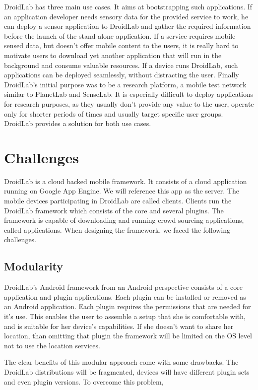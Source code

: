 \documentclass[conference,letterpaper]{IEEEtran}
\begin{document}
DroidLab has three main use cases. It aims at bootstrapping such applications. If an application developer needs sensory data for the provided service to work, he can deploy a sensor application to DroidLab and gather the required information before the launch of the stand alone application. If a service requires mobile sensed data, but doesn't offer mobile content to the users, it is really hard to motivate users to download yet another application that will run in the background and consume valuable resources. If a device runs DroidLab, such applications can be deployed seamlessly, without distracting the user. Finally DroidLab's initial purpose was to be a research platform, a mobile test network similar to PlanetLab and SenseLab. It is especially difficult to deploy applications for research purposes, as they usually don't provide any value to the user, operate only for shorter periods of times and usually target specific user groups. DroidLab provides a solution for both use cases.

\section{Challenges}
DroidLab is a cloud backed mobile framework. It consists of a cloud application running on Google App Engine. We will reference this app as the server. The mobile devices participating in DroidLab are called clients. Clients run the DroidLab framework which consists of the core and several plugins. The framework is capable of downloading and running crowd sourcing applications, called applications. When designing the framework, we faced the following challenges.

\subsection{Modularity}
DroidLab's Android framework from an Android perspective consists of a core application and plugin applications. Each plugin can be installed or removed as an Android application. Each plugin requires the permissions that are needed for it's use. This enables the user to assemble a setup that she is comfortable with, and is suitable for her device's capabilities. If she doesn't want to share her location, than omitting that plugin the framework will be limited on the OS level not to use the location services.

The clear benefits of this modular approach come with some drawbacks. The DroidLab distributions will be fragmented, devices will have different plugin sets and even plugin versions. To overcome this problem, 
\end{document}
